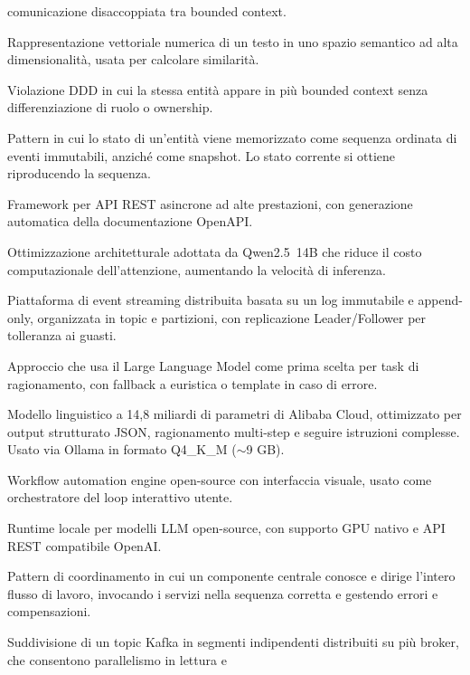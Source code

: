 \documentclass[12pt,a4paper]{report}
\begin{document}
\begin{description}[style=nextline]
        comunicazione disaccoppiata tra bounded context.
  \item[Embedding:] Rappresentazione vettoriale numerica di un testo in uno
        spazio semantico ad alta dimensionalità, usata per calcolare similarità.
  \item[Entity Overlap:] Violazione DDD in cui la stessa entità appare in più
        bounded context senza differenziazione di ruolo o ownership.
  \item[Event Sourcing:] Pattern in cui lo stato di un'entità viene memorizzato
        come sequenza ordinata di eventi immutabili, anziché come snapshot.
        Lo stato corrente si ottiene riproducendo la sequenza.
  \item[FastAPI:] Framework per API REST asincrone ad alte prestazioni,
        con generazione automatica della documentazione OpenAPI.
  \item[GQA (Grouped-Query Attention):] Ottimizzazione architetturale adottata da
        Qwen2.5~14B che riduce il costo computazionale dell'attenzione, aumentando
        la velocità di inferenza.
  \item[Kafka:] Piattaforma di event streaming distribuita basata su un log
        immutabile e append-only, organizzata in topic e partizioni, con
        replicazione Leader/Follower per tolleranza ai guasti.
  \item[LLM-first:] Approccio che usa il Large Language Model come prima scelta
        per task di ragionamento, con fallback a euristica o template in caso di errore.
  \item[Qwen2.5~14B:] Modello linguistico a 14,8 miliardi di parametri di Alibaba Cloud,
        ottimizzato per output strutturato JSON, ragionamento multi-step e seguire
        istruzioni complesse. Usato via Ollama in formato Q4\_K\_M ($\sim$9 GB).
  \item[n8n:] Workflow automation engine open-source con interfaccia visuale,
        usato come orchestratore del loop interattivo utente.
  \item[Ollama:] Runtime locale per modelli LLM open-source, con supporto GPU
        nativo e API REST compatibile OpenAI.
  \item[Orchestrazione:] Pattern di coordinamento in cui un componente centrale
        conosce e dirige l'intero flusso di lavoro, invocando i servizi nella
        sequenza corretta e gestendo errori e compensazioni.
  \item[Partizione:] Suddivisione di un topic Kafka in segmenti indipendenti
        distribuiti su più broker, che consentono parallelismo in lettura e

\end{description}
\end{document}
